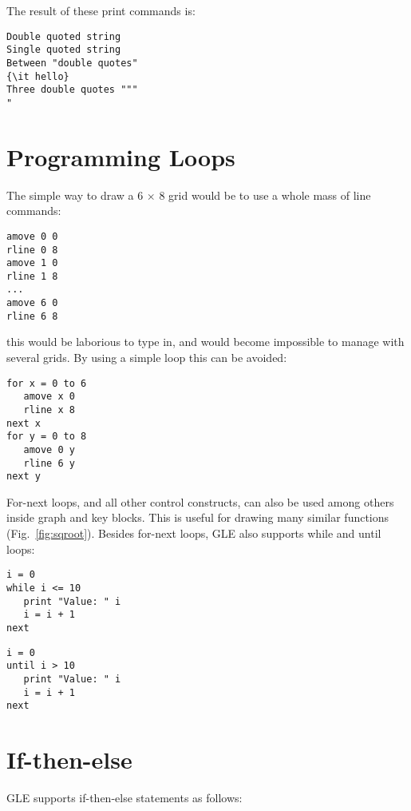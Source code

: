The result of these print commands is:

\preglecode{}
\begin{Verbatim}
Double quoted string
Single quoted string
Between "double quotes"
{\it hello}
Three double quotes """
"
\end{Verbatim}
\postglecode{}

\section{Programming Loops}

The simple way to draw a 6 $\times$ 8 grid would be to use a whole mass 
of line commands:

\preglecode{}
\begin{Verbatim}
amove 0 0 
rline 0 8 
amove 1 0 
rline 1 8 
...
amove 6 0 
rline 6 8
\end{Verbatim}
\postglecode{}

this would be laborious to type in, and would become 
impossible to manage with several grids.  By using a simple loop
this can be avoided:

\preglecode{}
\begin{Verbatim}
for x = 0 to 6
   amove x 0 
   rline x 8 
next x
for y = 0 to 8
   amove 0 y 
   rline 6 y 
next y 
\end{Verbatim}
\postglecode{}

For-next loops, and all other control constructs, can also be used among others inside graph and key blocks. This is useful for drawing many similar functions (Fig.~\ref{fig:sqroot}). Besides for-next loops, GLE also supports while and until loops:

\preglecode{}
\begin{Verbatim}
i = 0
while i <= 10
   print "Value: " i
   i = i + 1
next
\end{Verbatim}
\postglecode{}

\preglecode{}
\begin{Verbatim}
i = 0
until i > 10
   print "Value: " i
   i = i + 1
next
\end{Verbatim}
\postglecode{}

\section{If-then-else}

GLE supports if-then-else statements as follows:

